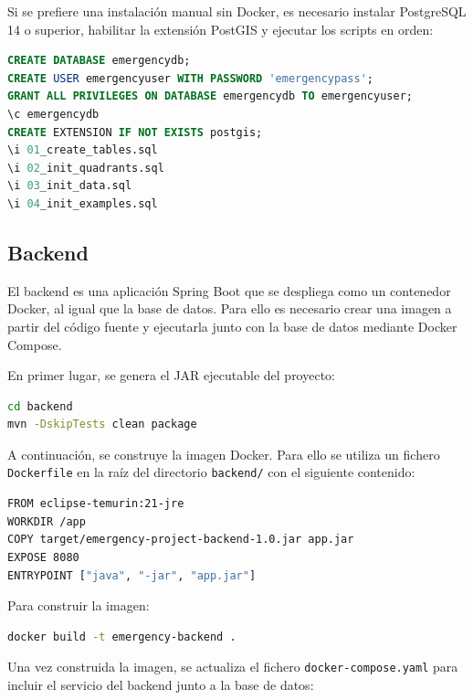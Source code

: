 Si se prefiere una instalación manual sin Docker, es necesario instalar PostgreSQL 14 o superior, habilitar la extensión PostGIS y ejecutar los scripts en orden:

\begin{lstlisting}[language=SQL]
CREATE DATABASE emergencydb;
CREATE USER emergencyuser WITH PASSWORD 'emergencypass';
GRANT ALL PRIVILEGES ON DATABASE emergencydb TO emergencyuser;
\c emergencydb
CREATE EXTENSION IF NOT EXISTS postgis;
\i 01_create_tables.sql
\i 02_init_quadrants.sql
\i 03_init_data.sql
\i 04_init_examples.sql
\end{lstlisting}

\subsection{Backend}

El backend es una aplicación Spring Boot que se despliega como un contenedor Docker, al igual que la base de datos. Para ello es necesario crear una imagen a partir del código fuente y ejecutarla junto con la base de datos mediante Docker Compose.

En primer lugar, se genera el JAR ejecutable del proyecto:

\begin{lstlisting}[language=Bash]
cd backend
mvn -DskipTests clean package
\end{lstlisting}

A continuación, se construye la imagen Docker. Para ello se utiliza un fichero \texttt{Dockerfile} en la raíz del directorio \texttt{backend/} con el siguiente contenido:

\begin{lstlisting}[language=bash]
FROM eclipse-temurin:21-jre
WORKDIR /app
COPY target/emergency-project-backend-1.0.jar app.jar
EXPOSE 8080
ENTRYPOINT ["java", "-jar", "app.jar"]
\end{lstlisting}

Para construir la imagen:

\begin{lstlisting}[language=Bash]
docker build -t emergency-backend .
\end{lstlisting}

Una vez construida la imagen, se actualiza el fichero \texttt{docker-compose.yaml} para incluir el servicio del backend junto a la base de datos:

